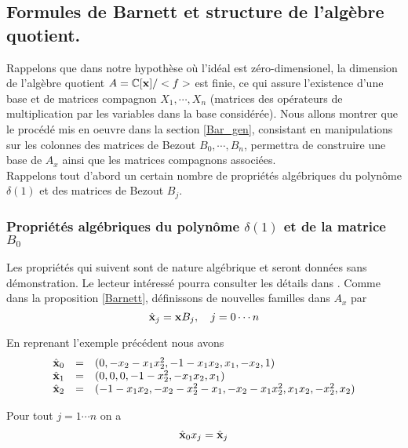 \documentclass{standalone}
\begin{document}
  \subsection{Formules de Barnett et structure de l'algèbre quotient.}

  Rappelons que dans notre hypothèse où l'idéal est zéro-dimensionel, la dimension de l'algèbre quotient $A = \mathbb{C}[\bold{x}]/<f>$ est finie, ce qui assure l'existence d'une base et de matrices compagnon $X_1,\cdots, X_n$ (matrices des opérateurs de multiplication par les variables dans la base considérée). Nous allons montrer que le procédé mis en oeuvre dans la section \ref{Bar_gen}, consistant en manipulations sur les colonnes des matrices de Bezout $B_0, \cdots, B_n $, permettra de construire une base de $A_x$ ainsi que les matrices compagnons associées.\\
  Rappelons tout d'abord un certain nombre de propriétés algébriques du polynôme $\delta(1)$ et des matrices de Bezout $B_j$.

  \subsubsection{Propriétés algébriques du polynôme $\delta(1)$ et de la matrice $B_0$}
  Les propriétés qui suivent sont de nature algébrique et seront données sans démonstration. Le lecteur intéressé pourra consulter les détails dans \cite{jpc, CM}. Comme dans la proposition \ref{Barnett}, définissons de nouvelles familles dans $A_x$ par
  \begin{equation}
  		\hat{\bold{x}}_j  =  \bold{x}B_j, \quad j=0\cdots n
  \end{equation}

  \begin{exmp}
  En reprenant l'exemple précédent nous avons
  \begin{equation}
  	\begin{array}{lll}
  		\hat{\bold{x}}_0 & = & (0, -x_2 - x_1x_2^2, -1 - x_1x_2, x_1, -x_2, 1) \\
  		\hat{\bold{x}}_1 & = & (0, 0, 0, -1 - x_2^2, -x_1x_2, x_1) \\
  		\hat{\bold{x}}_2 & = & (-1 - x_1x_2, -x_2 - x_2^2 - x_1, - x_2 - x_1x_2^2, x_1x_2, -x_2^2, x_2)
  	\end{array}
  \end{equation}
  \end{exmp}

  \begin{prop}
  \label{xj}
  Pour tout $j=1\cdots n$ on a
  \begin{equation}
      \hat{\bold{x}}_0x_j = \hat{\bold{x}}_j
  \end{equation}
  \end{prop}
\end{document}
